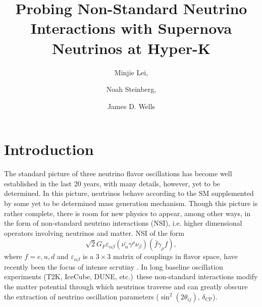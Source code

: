 \documentclass[a4paper,12pt]{article}
\title{Probing Non-Standard Neutrino Interactions with Supernova Neutrinos at Hyper-K}
\author{Minjie Lei,}
\author{Noah Steinberg,}
\author{James D. Wells}
\affiliation{Leinweber Center for Theoretical Physics, Department of Physics, University of Michigan
Ann Arbor, MI 48109 USA}
\begin{document}
\maketitle
\flushbottom

\section{Introduction}
The standard picture of three neutrino flavor oscillations has become well established in the last 20 years, with many details, however, yet to be determined. In this picture, neutrinos behave according to the SM supplemented by some yet to be determined mass generation mechanism. Though this picture is rather complete, there is room for new physics to appear, among other ways, in the form of non-standard neutrino interactions (NSI), i.e. higher dimensional operators involving neutrinos and matter. NSI of the form 
\begin{equation} \label{eq:1}
 \sqrt{2}G_{F}\varepsilon_{\alpha\beta}(\bar{\nu_{\alpha}}\gamma^{\rho}\nu_{\beta})(\bar{f}\gamma_{\rho}f),
 \end{equation}
 where $f = e,u,d$ and $\varepsilon_{\alpha\beta}$ is a $3\times3$ matrix of couplings in flavor space, have recently been the focus of intense scrutiny \cite{Rius:2018cjf,Experiments,Altmannshofer:2018xyo,Status}. In long baseline oscillation experiments (T2K, IceCube, DUNE, etc.)\ these non-standard interactions modify the matter potential through which neutrinos traverse and can greatly obscure the extraction of neutrino oscillation parameters ($\sin^2(2\theta_{ij})$, $\delta_{\text{CP}}$). 
\end{document}
